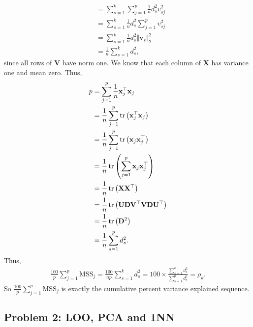 \begin{enumerate}[label=(\alph*)]
\begin{align*}
        &=\sum_{s=1}^k \sum_{j=1}^p \frac{1}{n} d_s^2 v_{sj}^2\\
        &=\sum_{s=1}^k \frac{1}{n} d_s^2 \sum_{j=1}^p v_{sj}^2\\
        &=\sum_{s=1}^k \frac{1}{n}d_s^2 \Vert \mathbf{v}_s \Vert_2^2 \\
        &=\frac{1}{n}\sum_{s=1}^k d_s^2,
    \end{align*}
    since all rows of $\mathbf{V}$ have norm one. We know that each column of $\mathbf{X}$ has variance one and mean zero. Thus,
    \begin{align*}
        p&=\sum_{j=1}^p \frac{1}{n} \mathbf{x}_j^\top \mathbf{x}_j\\
        &=\frac{1}{n}\sum_{j=1}^p \operatorname{tr}\left(\mathbf{x}_j^\top \mathbf{x}_j\right)\\
        &=\frac{1}{n}\sum_{j=1}^p \operatorname{tr}\left(\mathbf{x}_j\mathbf{x}_j^\top \right)\\
        &=\frac{1}{n}\operatorname{tr}\left(\sum_{j=1}^p \mathbf{x}_j\mathbf{x}_j^\top \right)\\
        &=\frac{1}{n}\operatorname{tr}\left(\mathbf{X}\mathbf{X}^\top\right)\\
        &=\frac{1}{n}\operatorname{tr}\left(\mathbf{U}\mathbf{D}\mathbf{V}^\top \mathbf{V}\mathbf{D}\mathbf{U}^\top\right)\\
        &=\frac{1}{n}\operatorname{tr}\left(\mathbf{D}^2\right)\\
        &=\frac{1}{n}\sum_{s=1}^p d_s^2.
    \end{align*}
    Thus,
    \begin{align*}
        \frac{100}{p}\sum_{j=1}^p \mathrm{MSS}_j =\frac{100}{np} \sum_{s=1}^k d_s^2=100 \times \frac{\sum_{s=1}^k d_s^2}{\sum_{s=1}^p d_s^2} =\rho_k.
    \end{align*}
    So $\frac{100}{p}\sum_{j=1}^p \mathrm{MSS}_j$ is exactly the cumulative percent variance explained sequence.
\end{enumerate}

\subsection*{Problem 2: LOO, PCA and 1NN}

